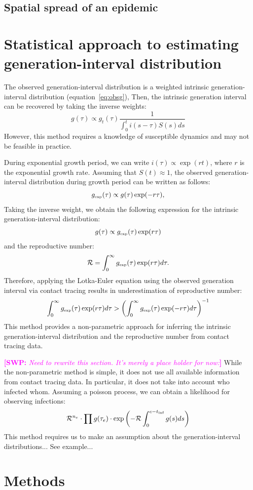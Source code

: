\documentclass{article}
\newcommand{\RR}{\ensuremath{{\mathcal R}}}
\newcommand{\tsub}[2]{#1_{{\textrm{\tiny #2}}}}
\newcommand{\comment}[3]{\textcolor{#1}{\textbf{[#2: }\textsl{#3}\textbf{]}}}
\newcommand{\swp}[1]{\comment{magenta}{SWP}{#1}}
\begin{document}
\subsection{Spatial spread of an epidemic}



\section{Statistical approach to estimating generation-interval distribution}

The observed generation-interval distribution is a weighted intrinsic generation-interval distribution (equation~\ref{eq:obsg}),
Then, the intrinsic generation interval can be recovered by taking the inverse weights:
\begin{equation}
g(\tau) \propto g_t(\tau) \frac{1}{\int_{0}^t i(s-\tau) S(s) ds}
\end{equation}
However, this method requires a knowledge of susceptible dynamics and may not be feasible in practice.

During exponential growth period, we can write $i(\tau) \propto \exp(r t)$, where $r$ is the exponential growth rate.
Assuming that $S(t) \approx 1$, the observed generation-interval distribution during growth period can be written as follows:
\begin{equation}
\tsub{g}{exp}(\tau) \propto g(\tau) \exp(-r\tau),
\end{equation}
Taking the inverse weight, we obtain the following expression for the intrinsic generation-interval distribution:
\begin{equation}
g(\tau) \propto \tsub{g}{exp}(\tau) \exp(r\tau)
\end{equation}
and the reproductive number:
\begin{equation}
\RR = \int_0^\infty \tsub{g}{exp}(\tau) \exp(r\tau) d\tau.
\end{equation}
Therefore, applying the Lotka-Euler equation using the observed generation interval via contact tracing results in underestimation of reproductive number:
\begin{equation}
\int_0^\infty \tsub{g}{exp}(\tau) \exp(r\tau) d\tau > \left(\int_0^\infty \tsub{g}{exp}(\tau) \exp(-r\tau) d\tau\right)^{-1}
\end{equation}
This method provides a non-parametric approach for inferring the intrinsic generation-interval distribution and the reproductive number from contact tracing data.

\swp{Need to rewrite this section. It's merely a place holder for now:}
While the non-parametric method is simple, it does not use all available information from contact tracing data.
In particular, it does not take into account who infected whom.
Assuming a poisson process, we can obtain a likelihood for observing infections:
\begin{equation}
\RR^{n_e} \cdot \prod g(\tau_e) \cdot \exp \left(- \RR \int_0^{c - t_{\tiny\textrm{inf}}} g(s) ds \right)
\end{equation}
This method requires us to make an assumption about the generation-interval distributions... See example...




\section{Methods}




\end{document}
